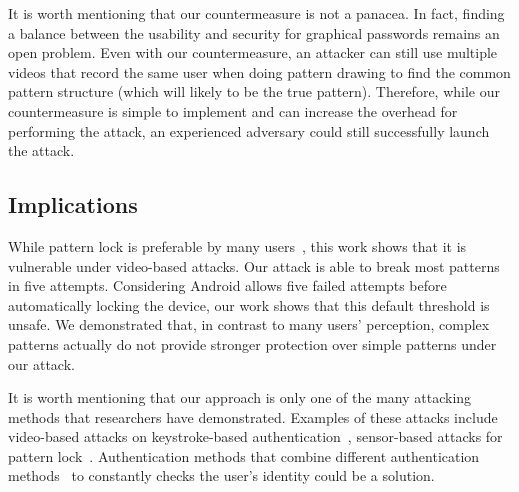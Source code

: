 It is worth mentioning that our countermeasure is not a panacea. In fact, finding a balance between the
usability and security for graphical passwords remains an open problem\FIXME{\cite{}}.
Even with our countermeasure, an attacker can still use multiple videos that record the same user when doing pattern
drawing to find the common pattern structure (which will likely to be the true pattern). Therefore, while our
countermeasure is simple to implement and can increase the overhead for performing the attack, an experienced
adversary could still successfully launch the attack.




\subsection{Implications}
While pattern lock is preferable by many users~\cite{androidstudy}, this     work shows
that it is vulnerable under video-based attacks. Our attack
is able to break most patterns in five attempts. Considering Android
allows five failed attempts before automatically locking the device, our work
shows that this default threshold is unsafe. We demonstrated that, in contrast to many users'
perception, complex patterns actually do not provide stronger protection over simple patterns under our attack.

It is worth mentioning that our approach is only one of the many attacking
methods that researchers have demonstrated. Examples of these attacks include
video-based attacks on keystroke-based authentication~\cite{shukla2014beware,yue2014blind}, sensor-based attacks for
pattern lock~\cite{zhang2016privacy}. Authentication methods that combine different
authentication methods~\cite{de2012touch,stefan2012robustness,lingsecure,mannan2007using} to constantly checks the user's identity could be
a solution. %



